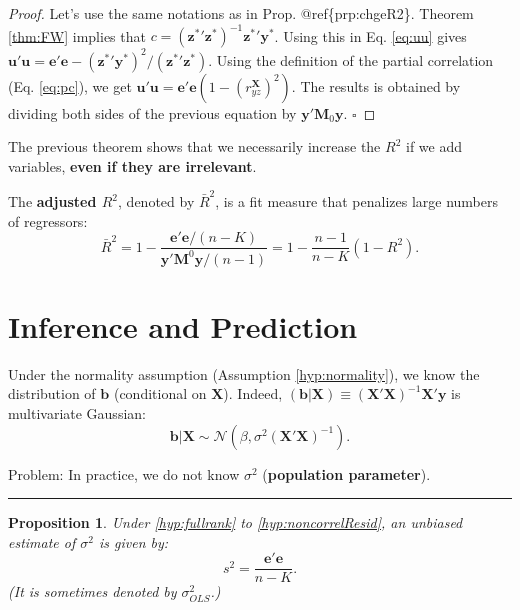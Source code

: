 \documentclass[
]{book}
\newtheorem{proposition}{Proposition}[chapter]
\theoremstyle{definition}
\theoremstyle{definition}
\theoremstyle{definition}
\theoremstyle{definition}
\theoremstyle{remark}
\begin{document}
\begin{proof}
Let's use the same notations as in Prop. @ref\{prp:chgeR2\}. Theorem \ref{thm:FW} implies that \(c = (\mathbf{z^*}'\mathbf{z^*})^{-1}\mathbf{z^*}'\mathbf{y^*}\). Using this in Eq. \eqref{eq:uu} gives \(\mathbf{u}'\mathbf{u} = \mathbf{e}'\mathbf{e} - (\mathbf{z^*}'\mathbf{y^*})^2/(\mathbf{z^*}'\mathbf{z^*})\). Using the definition of the partial correlation (Eq. \eqref{eq:pc}), we get \(\mathbf{u}'\mathbf{u} = \mathbf{e}'\mathbf{e}\left(1 - (r_{yz}^\mathbf{X})^2\right)\). The results is obtained by dividing both sides of the previous equation by \(\mathbf{y}'\mathbf{M}_0\mathbf{y}\). \(\square\)
\end{proof}

The previous theorem shows that we necessarily increase the \(R^2\) if we add variables, \textbf{even if they are irrelevant}.

The \textbf{adjusted \(R^2\)}, denoted by \(\bar{R}^2\), is a fit measure that penalizes large numbers of regressors:
\begin{equation*}
\boxed{\bar{R}^2 = 1 - \frac{\mathbf{e}'\mathbf{e}/(n-K)}{\mathbf{y}'\mathbf{M}^0\mathbf{y}/(n-1)} = 1 - \frac{n-1}{n-K}(1-R^2).}
\end{equation*}

\hypertarget{inference-and-prediction}{%
\section{Inference and Prediction}\label{inference-and-prediction}}

Under the normality assumption (Assumption \ref{hyp:normality}), we know the distribution of \(\mathbf{b}\) (conditional on \(\mathbf{X}\)). Indeed, \((\mathbf{b}|\mathbf{X}) \equiv (\mathbf{X}'\mathbf{X})^{-1} \mathbf{X}'\mathbf{y}\) is multivariate Gaussian:
\begin{equation}
\mathbf{b}|\mathbf{X} \sim \mathcal{N}(\beta,\sigma^2(\mathbf{X}'\mathbf{X})^{-1}).\label{eq:distriBcondi}
\end{equation}

Problem: In practice, we do not know \(\sigma^2\) (\textbf{population parameter}).

\begin{center}\rule{0.5\linewidth}{0.5pt}\end{center}

\begin{proposition}
\protect\hypertarget{prp:expects2}{}\label{prp:expects2}Under \ref{hyp:fullrank} to \ref{hyp:noncorrelResid}, an unbiased estimate of \(\sigma^2\) is given by:
\begin{equation}
s^2 = \frac{\mathbf{e}'\mathbf{e}}{n-K}.\label{eq:s2}
\end{equation}
(It is sometimes denoted by \(\sigma^2_{OLS}\).)
\end{proposition}
\end{document}

